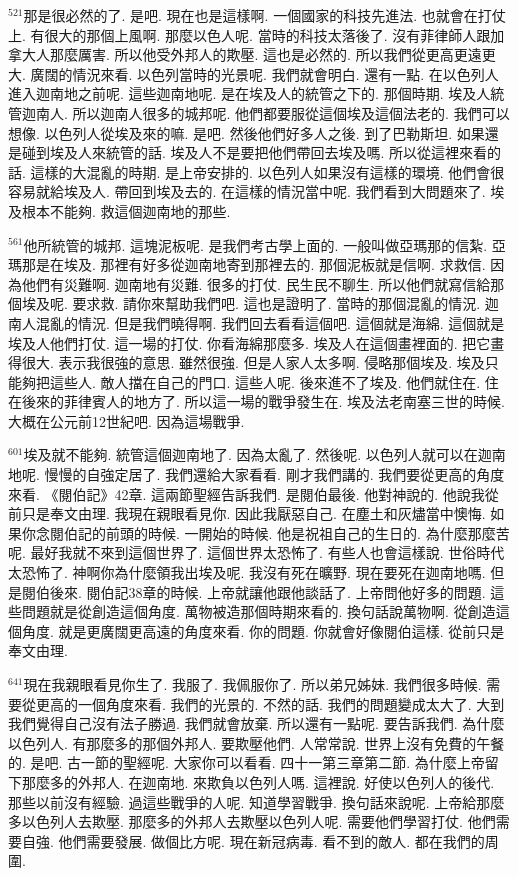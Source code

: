 \documentclass{book}
\begin{document}
$^{521}$那是很必然的了.
是吧.
現在也是這樣啊.
一個國家的科技先進法.
也就會在打仗上.
有很大的那個上風啊.
那麼以色人呢.
當時的科技太落後了.
沒有菲律師人跟加拿大人那麼厲害.
所以他受外邦人的欺壓.
這也是必然的.
所以我們從更高更遠更大.
廣闊的情況來看.
以色列當時的光景呢.
我們就會明白.
還有一點.
在以色列人進入迦南地之前呢.
這些迦南地呢.
是在埃及人的統管之下的.
那個時期.
埃及人統管迦南人.
所以迦南人很多的城邦呢.
他們都要服從這個埃及這個法老的.
我們可以想像.
以色列人從埃及來的嘛.
是吧.
然後他們好多人之後.
到了巴勒斯坦.
如果還是碰到埃及人來統管的話.
埃及人不是要把他們帶回去埃及嗎.
所以從這裡來看的話.
這樣的大混亂的時期.
是上帝安排的.
以色列人如果沒有這樣的環境.
他們會很容易就給埃及人.
帶回到埃及去的.
在這樣的情況當中呢.
我們看到大問題來了.
埃及根本不能夠.
救這個迦南地的那些.

$^{561}$他所統管的城邦.
這塊泥板呢.
是我們考古學上面的.
一般叫做亞瑪那的信紮.
亞瑪那是在埃及.
那裡有好多從迦南地寄到那裡去的.
那個泥板就是信啊.
求救信.
因為他們有災難啊.
迦南地有災難.
很多的打仗.
民生民不聊生.
所以他們就寫信給那個埃及呢.
要求救.
請你來幫助我們吧.
這也是證明了.
當時的那個混亂的情況.
迦南人混亂的情況.
但是我們曉得啊.
我們回去看看這個吧.
這個就是海綿.
這個就是埃及人他們打仗.
這一場的打仗.
你看海綿那麼多.
埃及人在這個畫裡面的.
把它畫得很大.
表示我很強的意思.
雖然很強.
但是人家人太多啊.
侵略那個埃及.
埃及只能夠把這些人.
敵人擋在自己的門口.
這些人呢.
後來進不了埃及.
他們就住在.
住在後來的菲律賓人的地方了.
所以這一場的戰爭發生在.
埃及法老南塞三世的時候.
大概在公元前12世紀吧.
因為這場戰爭.

$^{601}$埃及就不能夠.
統管這個迦南地了.
因為太亂了.
然後呢.
以色列人就可以在迦南地呢.
慢慢的自強定居了.
我們還給大家看看.
剛才我們講的.
我們要從更高的角度來看.
《閱伯記》42章.
這兩節聖經告訴我們.
是閱伯最後.
他對神說的.
他說我從前只是奉文由理.
我現在親眼看見你.
因此我厭惡自己.
在塵土和灰燼當中懊悔.
如果你念閱伯記的前頭的時候.
一開始的時候.
他是祝祖自己的生日的.
為什麼那麼苦呢.
最好我就不來到這個世界了.
這個世界太恐怖了.
有些人也會這樣說.
世俗時代太恐怖了.
神啊你為什麼領我出埃及呢.
我沒有死在曠野.
現在要死在迦南地嗎.
但是閱伯後來.
閱伯記38章的時候.
上帝就讓他跟他談話了.
上帝問他好多的問題.
這些問題就是從創造這個角度.
萬物被造那個時期來看的.
換句話說萬物啊.
從創造這個角度.
就是更廣闊更高遠的角度來看.
你的問題.
你就會好像閱伯這樣.
從前只是奉文由理.

$^{641}$現在我親眼看見你生了.
我服了.
我佩服你了.
所以弟兄姊妹.
我們很多時候.
需要從更高的一個角度來看.
我們的光景的.
不然的話.
我們的問題變成太大了.
大到我們覺得自己沒有法子勝過.
我們就會放棄.
所以還有一點呢.
要告訴我們.
為什麼以色列人.
有那麼多的那個外邦人.
要欺壓他們.
人常常說.
世界上沒有免費的午餐的.
是吧.
古一節的聖經呢.
大家你可以看看.
四十一第三章第二節.
為什麼上帝留下那麼多的外邦人.
在迦南地.
來欺負以色列人嗎.
這裡說.
好使以色列人的後代.
那些以前沒有經驗.
過這些戰爭的人呢.
知道學習戰爭.
換句話來說呢.
上帝給那麼多以色列人去欺壓.
那麼多的外邦人去欺壓以色列人呢.
需要他們學習打仗.
他們需要自強.
他們需要發展.
做個比方呢.
現在新冠病毒.
看不到的敵人.
都在我們的周圍.
\end{document}
